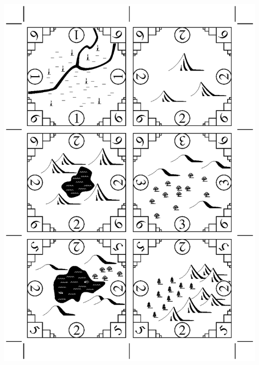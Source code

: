 \documentclass[12pt]{article}
\begin{document}
\begin{center}
\includegraphics[width=7in]{tile_sheet_3.eps}

\vfill

\newpage

~\vfill


\end{center}
\end{document}

